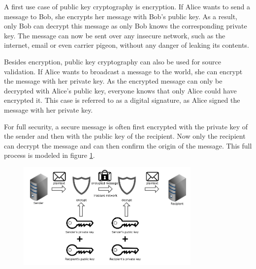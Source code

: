 A first use case of public key cryptography is encryption. If Alice wants to send a message to Bob, she encrypts her message with Bob's public key. As a result, only Bob can decrypt this message as only Bob knows the corresponding private key. The message can now be sent over any insecure network, such as the internet, email or even carrier pigeon, without any danger of leaking its contents.

Besides encryption, public key cryptography can also be used for source validation. If Alice wants to broadcast a message to the world, she can encrypt the message with her private key. As the encrypted message can only be decrypted with Alice's public key, everyone knows that only Alice could have encrypted it. This case is referred to as a digital signature, as Alice signed the message with her private key. 

For full security, a secure message is often first encrypted with the private key of the sender and then with the public key of the recipient. Now only the recipient can decrypt the message and can then confirm the origin of the message. This full process is modeled in figure \ref{fig:rsa-diagram}.

\begin{figure}[h]
\centering
\includegraphics[width=0.8\textwidth]{paper-images/rsa-diagram.png}
\caption{}
\label{fig:rsa-diagram}
\end{figure}

